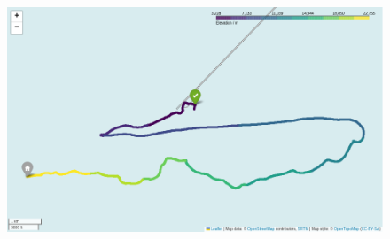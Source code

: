 \documentclass[11pt,a4paper,faculty=we,language=en,doctype=report]{cls/ugent-doc}
\begin{document}
\begin{figure}
	\includegraphics[width=\textwidth]{WeatherBalloonPath.png}
\end{figure}

\appendix
\end{document}
